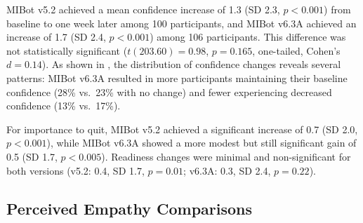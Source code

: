 MIBot v5.2 achieved a mean confidence increase of 1.3 (SD 2.3, $p<0.001$)
from baseline to one week later among 100 participants, and
MIBot v6.3A achieved an increase of 1.7 (SD 2.4, $p<0.001$) among 106 participants.
This difference was not statistically significant ($t(203.60) = 0.98$,
$p = 0.165$, one-tailed, Cohen's $d = 0.14$). As shown in ,
the distribution of confidence changes reveals several patterns: MIBot v6.3A
resulted in more participants maintaining their baseline confidence (28\% vs.\ 23\%
with no change) and fewer experiencing decreased confidence (13\% vs.\ 17\%).

For importance to quit, MIBot v5.2 achieved a significant increase of 0.7 (SD 2.0, $p<0.001$), while MIBot v6.3A showed a more modest but still significant gain of 0.5 (SD 1.7, $p<0.005$). Readiness changes were minimal and non-significant for both versions (v5.2: 0.4, SD 1.7, $p=0.01$; v6.3A: 0.3, SD 2.4, $p=0.22$).

\subsection*{Perceived Empathy Comparisons}

